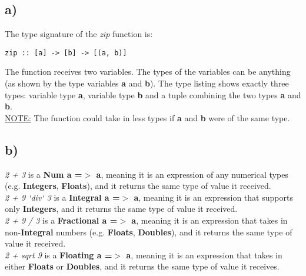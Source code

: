 \documentclass{article}
\begin{document}
\subsection*{a)} 
The type signature of the \textit{zip} function is: \\
\begin{lstlisting}[]
zip :: [a] -> [b] -> [(a, b)]
\end{lstlisting}
The function receives two variables. The types of the variables can be anything (as shown by the type variables 
\textbf{a} and \textbf{b}). The type listing shows exactly three types: variable type \textbf{a}, 
variable type \textbf{b} and a tuple combining the two types \textbf{a} and \textbf{b}. \\
\underline{NOTE:} The function could take in less types if \textbf{a} and \textbf{b} were of the same type. \\

\subsection*{b)}
\textit{2 + 3} is a \textbf{Num a =$>$ a}, meaning it is an expression of any numerical types
(e.g. \textbf{Integers}, \textbf{Floats}), and it returns the same type of value it received. \\
\textit{2 + 9 `div` 3} is a \textbf{Integral a =$>$ a}, meaning it is an expression 
that supports only \textbf{Integers}, and it returns the same type of value it received. \\
\textit{2 + 9 / 3} is a \textbf{Fractional a =$>$ a}, meaning it is an expression that
takes in non-\textbf{Integral} numbers (e.g. \textbf{Floats}, \textbf{Doubles}), and 
it returns the same type of value it received. \\
\textit{2 + sqrt 9} is a \textbf{Floating a =$>$ a}, meaning it is an expression
that takes in either \textbf{Floats} or \textbf{Doubles}, and it returns the same type of value it receives. \\
\end{document}
